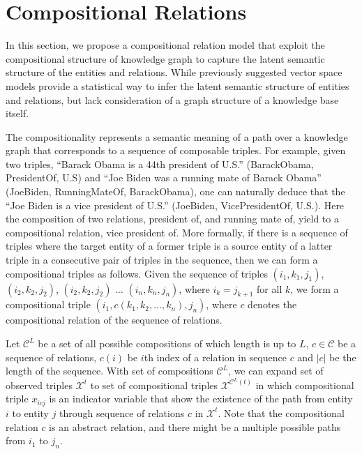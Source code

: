\section{Compositional Relations}
\label{sec:comp}

In this section, we propose a compositional relation model that exploit the compositional structure of
knowledge graph to capture the latent semantic structure of the entities and relations.
While previously suggested vector space models provide a statistical way to infer the latent semantic
structure of entities and relations, but lack consideration of a graph structure of a knowledge base itself.

The compositionality represents a semantic meaning of a path over a knowledge graph that corresponds to a
sequence of composable triples.
For example, given two triples, ``Barack Obama is a 44th president of U.S.'' (BarackObama, PresidentOf,
U.S) and ``Joe Biden was a running mate of Barack Obama'' (JoeBiden, RunningMateOf, BarackObama),
one can naturally deduce that the ``Joe Biden is a vice president of U.S.'' (JoeBiden, VicePresidentOf, U.S.).
Here the composition of two relations, president of, and running mate of, yield to a compositional relation,
vice president of.
More formally, if there is a sequence of triples where the target entity of a former triple is a source entity of a
latter triple in a consecutive pair of triples in the sequence, then we can form a compositional triples
as follows.
Given the sequence of triples
$(i_1, k_1 ,j_1)$,  $(i_2, k_2, j_2)$, $(i_2, k_2, j_2)$ $\dots$ $(i_n, k_n, j_n)$, where $i_k = j_{k+1}$ for all $k
$,  we form a compositional triple $(i_1, {c}(k_1, k_2, \dots, k_n), j_n)$, where $c$ denotes the compositional
relation of the sequence of relations.

Let $\mathcal{C}^{L}$ be a set of all possible compositions of which length is up to $L$, $c \in \mathcal{C}$
be a sequence of relations, $c(i)$ be $i$th index of a relation in sequence $c$ and $|c|$ be the length of the
sequence. With set of compositions $\mathcal{C}^{L}$, we can expand set of observed triples
$\mathcal{X}^{t}$ to set of compositional triples $\mathcal{X}^{\mathcal{C}^{L}(t)}$ in which
compositional triple $x_{icj}$ is an
indicator variable that show the existence of the path from entity $i$ to entity $j$ through sequence
of relations
$c$ in $\mathcal{X}^{t}$. Note that the compositional relation $c$ is an abstract relation, and there might be a
multiple possible paths from $i_1$ to $j_n$.

